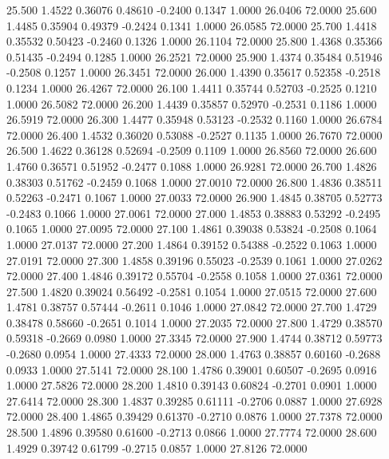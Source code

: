   25.500   1.4522   0.36076   0.48610  -0.2400   0.1347   1.0000  26.0406  72.0000
  25.600   1.4485   0.35904   0.49379  -0.2424   0.1341   1.0000  26.0585  72.0000
  25.700   1.4418   0.35532   0.50423  -0.2460   0.1326   1.0000  26.1104  72.0000
  25.800   1.4368   0.35366   0.51435  -0.2494   0.1285   1.0000  26.2521  72.0000
  25.900   1.4374   0.35484   0.51946  -0.2508   0.1257   1.0000  26.3451  72.0000
  26.000   1.4390   0.35617   0.52358  -0.2518   0.1234   1.0000  26.4267  72.0000
  26.100   1.4411   0.35744   0.52703  -0.2525   0.1210   1.0000  26.5082  72.0000
  26.200   1.4439   0.35857   0.52970  -0.2531   0.1186   1.0000  26.5919  72.0000
  26.300   1.4477   0.35948   0.53123  -0.2532   0.1160   1.0000  26.6784  72.0000
  26.400   1.4532   0.36020   0.53088  -0.2527   0.1135   1.0000  26.7670  72.0000
  26.500   1.4622   0.36128   0.52694  -0.2509   0.1109   1.0000  26.8560  72.0000
  26.600   1.4760   0.36571   0.51952  -0.2477   0.1088   1.0000  26.9281  72.0000
  26.700   1.4826   0.38303   0.51762  -0.2459   0.1068   1.0000  27.0010  72.0000
  26.800   1.4836   0.38511   0.52263  -0.2471   0.1067   1.0000  27.0033  72.0000
  26.900   1.4845   0.38705   0.52773  -0.2483   0.1066   1.0000  27.0061  72.0000
  27.000   1.4853   0.38883   0.53292  -0.2495   0.1065   1.0000  27.0095  72.0000
  27.100   1.4861   0.39038   0.53824  -0.2508   0.1064   1.0000  27.0137  72.0000
  27.200   1.4864   0.39152   0.54388  -0.2522   0.1063   1.0000  27.0191  72.0000
  27.300   1.4858   0.39196   0.55023  -0.2539   0.1061   1.0000  27.0262  72.0000
  27.400   1.4846   0.39172   0.55704  -0.2558   0.1058   1.0000  27.0361  72.0000
  27.500   1.4820   0.39024   0.56492  -0.2581   0.1054   1.0000  27.0515  72.0000
  27.600   1.4781   0.38757   0.57444  -0.2611   0.1046   1.0000  27.0842  72.0000
  27.700   1.4729   0.38478   0.58660  -0.2651   0.1014   1.0000  27.2035  72.0000
  27.800   1.4729   0.38570   0.59318  -0.2669   0.0980   1.0000  27.3345  72.0000
  27.900   1.4744   0.38712   0.59773  -0.2680   0.0954   1.0000  27.4333  72.0000
  28.000   1.4763   0.38857   0.60160  -0.2688   0.0933   1.0000  27.5141  72.0000
  28.100   1.4786   0.39001   0.60507  -0.2695   0.0916   1.0000  27.5826  72.0000
  28.200   1.4810   0.39143   0.60824  -0.2701   0.0901   1.0000  27.6414  72.0000
  28.300   1.4837   0.39285   0.61111  -0.2706   0.0887   1.0000  27.6928  72.0000
  28.400   1.4865   0.39429   0.61370  -0.2710   0.0876   1.0000  27.7378  72.0000
  28.500   1.4896   0.39580   0.61600  -0.2713   0.0866   1.0000  27.7774  72.0000
  28.600   1.4929   0.39742   0.61799  -0.2715   0.0857   1.0000  27.8126  72.0000
